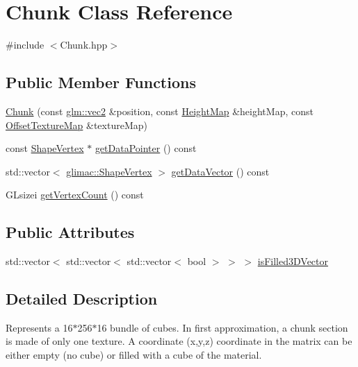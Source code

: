 \hypertarget{class_chunk}{}\section{Chunk Class Reference}
\label{class_chunk}


{\ttfamily \#include $<$Chunk.\+hpp$>$}

\subsection*{Public Member Functions}
\begin{DoxyCompactItemize}
\item 
\hyperlink{class_chunk_a33bf33185f6730fd5fc53848e2e11cc9}{Chunk} (const \hyperlink{group__core__types_gaa1618f51db67eaa145db101d8c8431d8}{glm\+::vec2} \&position, const \hyperlink{classglimac_1_1_height_map}{Height\+Map} \&height\+Map, const \hyperlink{class_offset_texture_map}{Offset\+Texture\+Map} \&texture\+Map)
\item 
const \hyperlink{structglimac_1_1_shape_vertex}{Shape\+Vertex} $\ast$ \hyperlink{class_chunk_ae718ab2053dedc39bdca0db795b1eec1}{get\+Data\+Pointer} () const
\item 
std\+::vector$<$ \hyperlink{structglimac_1_1_shape_vertex}{glimac\+::\+Shape\+Vertex} $>$ \hyperlink{class_chunk_a3d98f0c77cbac2a770ccb0447e4b7031}{get\+Data\+Vector} () const
\item 
G\+Lsizei \hyperlink{class_chunk_ac4a282e5b7f412244e73b0d3a8177af1}{get\+Vertex\+Count} () const
\end{DoxyCompactItemize}
\subsection*{Public Attributes}
\begin{DoxyCompactItemize}
\item 
std\+::vector$<$ std\+::vector$<$ std\+::vector$<$ bool $>$ $>$ $>$ \hyperlink{class_chunk_afe86634c18099b7975b0ce2de7a040ec}{is\+Filled3\+D\+Vector}
\end{DoxyCompactItemize}


\subsection{Detailed Description}
Represents a 16$\ast$256$\ast$16 bundle of cubes. In first approximation, a chunk section is made of only one texture. A coordinate (x,y,z) coordinate in the matrix can be either empty (no cube) or filled with a cube of the material. 

